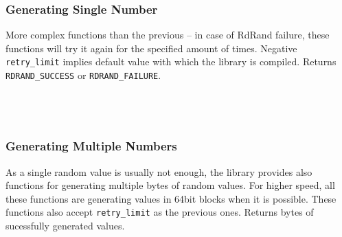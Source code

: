 \\

\\

\\

\subsubsection{Generating Single Number}\label{subsec:api:single-number}
More complex functions than the previous -- in case of RdRand failure, these functions will try it again for the specified amount of times. Negative {\tt retry\_limit} implies default value with which the library is compiled. Returns {\tt RDRAND\_SUCCESS} or {\tt RDRAND\_FAILURE}.\\


\\

\\

\\

\subsubsection{Generating Multiple Numbers}\label{subsec:api:multiple}
As a single random value is usually not enough, the library provides also functions for generating multiple bytes of random values. For higher speed, all these functions are generating values in 64bit blocks when it is possible.
These functions also accept {\tt retry\_limit} as the previous ones. Returns bytes of sucessfully generated values.\\


\\


